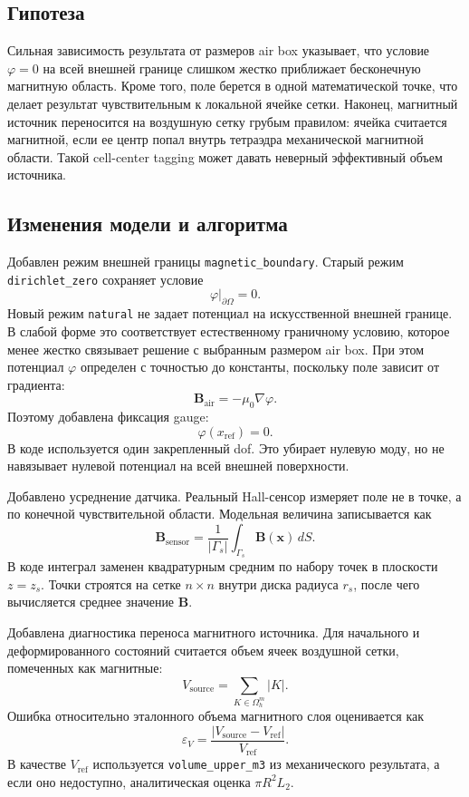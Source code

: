 \documentclass[12pt,a4paper]{article}
\begin{document}
\subsection*{Гипотеза}

Сильная зависимость результата от размеров air box указывает, что условие
\(\varphi=0\) на всей внешней границе слишком жестко приближает бесконечную
магнитную область. Кроме того, поле берется в одной математической точке, что
делает результат чувствительным к локальной ячейке сетки. Наконец, магнитный
источник переносится на воздушную сетку грубым правилом: ячейка считается
магнитной, если ее центр попал внутрь тетраэдра механической магнитной области.
Такой cell-center tagging может давать неверный эффективный объем источника.

\subsection*{Изменения модели и алгоритма}

Добавлен режим внешней границы \texttt{magnetic\_boundary}. Старый режим
\texttt{dirichlet\_zero} сохраняет условие
\[
    \varphi|_{\partial\Omega}=0.
\]
Новый режим \texttt{natural} не задает потенциал на искусственной внешней
границе. В слабой форме это соответствует естественному граничному условию,
которое менее жестко связывает решение с выбранным размером air box. При этом
потенциал \(\varphi\) определен с точностью до константы, поскольку поле зависит
от градиента:
\[
    \mathbf B_{\mathrm{air}} = -\mu_0 \nabla\varphi.
\]
Поэтому добавлена фиксация gauge:
\[
    \varphi(x_{\mathrm{ref}})=0.
\]
В коде используется один закрепленный dof. Это убирает нулевую моду, но не
навязывает нулевой потенциал на всей внешней поверхности.

Добавлено усреднение датчика. Реальный Hall-сенсор измеряет поле не в точке, а
по конечной чувствительной области. Модельная величина записывается как
\[
    \mathbf B_{\mathrm{sensor}}
    =
    \frac{1}{|\Gamma_s|}
    \int_{\Gamma_s} \mathbf B(\mathbf x)\,dS.
\]
В коде интеграл заменен квадратурным средним по набору точек в плоскости
\(z=z_s\). Точки строятся на сетке \(n\times n\) внутри диска радиуса
\(r_s\), после чего вычисляется среднее значение \(\mathbf B\).

Добавлена диагностика переноса магнитного источника. Для начального и
деформированного состояний считается объем ячеек воздушной сетки, помеченных
как магнитные:
\[
    V_{\mathrm{source}} = \sum_{K\in\Omega_h^m} |K|.
\]
Ошибка относительно эталонного объема магнитного слоя оценивается как
\[
    \varepsilon_V =
    \frac{|V_{\mathrm{source}} - V_{\mathrm{ref}}|}{V_{\mathrm{ref}}}.
\]
В качестве \(V_{\mathrm{ref}}\) используется \texttt{volume\_upper\_m3} из
механического результата, а если оно недоступно, аналитическая оценка
\(\pi R^2 L_2\).
\end{document}
